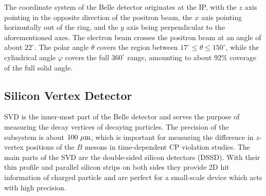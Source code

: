 The coordinate system of the Belle detector originates at the IP, with the $z$ axis pointing in the opposite direction of the positron beam, the $x$ axis pointing horizontally out of the ring, and the $y$ axis being perpendicular to the aforementioned axes. The electron beam crosses the positron beam at an angle of about $22^\circ$. The polar angle $\theta$ covers the region between $17^\circ \leq \theta \leq 150^\circ$, while the cylindrical angle $\varphi$ covers the full $360^\circ$ range, amounting to about $92\%$ coverage of the full solid angle.




\subsection{Silicon Vertex Detector}
SVD is the inner-most part of the Belle detector and serves the purpose of measuring the decay vertices of decaying particles. The precision of the subsystem is about $100\mathrm{~\mu m}$, which is important for measuring the difference in $z$-vertex positions of the $B$ mesons in time-dependent CP violation studies. The main parts of the SVD are the double-sided silicon detectors (DSSD). With their thin profile and parallel silicon strips on both sides they provide 2D hit information of charged particle and are perfect for a small-scale device which acts with high precision.

